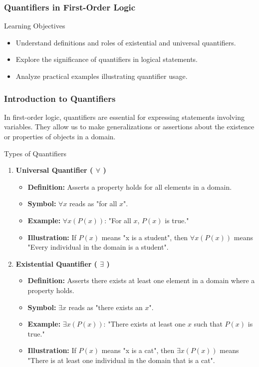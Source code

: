 \documentclass[aspectratio=169]{beamer}
\begin{document}
\begin{frame}[fragile]
    \frametitle{Quantifiers in First-Order Logic}
    \begin{block}{Learning Objectives}
        \begin{itemize}
            \item Understand definitions and roles of existential and universal quantifiers.
            \item Explore the significance of quantifiers in logical statements.
            \item Analyze practical examples illustrating quantifier usage.
        \end{itemize}
    \end{block}
\end{frame}

\begin{frame}[fragile]
    \frametitle{Introduction to Quantifiers}
    In first-order logic, quantifiers are essential for expressing statements involving variables.
    They allow us to make generalizations or assertions about the existence or properties of objects in a domain.
    
    \begin{block}{Types of Quantifiers}
        \begin{enumerate}
            \item \textbf{Universal Quantifier ( $\forall$ )}
                \begin{itemize}
                    \item \textbf{Definition:} Asserts a property holds for all elements in a domain.
                    \item \textbf{Symbol:} \( \forall x \) reads as "for all \( x \)".
                    \item \textbf{Example:} \( \forall x (P(x)) \): "For all \( x \), \( P(x) \) is true."
                    \item \textbf{Illustration:} If \( P(x) \) means "x is a student", then \( \forall x (P(x)) \) means "Every individual in the domain is a student".
                \end{itemize}
            \item \textbf{Existential Quantifier ( $\exists$ )}
                \begin{itemize}
                    \item \textbf{Definition:} Asserts there exists at least one element in a domain where a property holds.
                    \item \textbf{Symbol:} \( \exists x \) reads as "there exists an \( x \)".
                    \item \textbf{Example:} \( \exists x (P(x)) \): "There exists at least one \( x \) such that \( P(x) \) is true."
                    \item \textbf{Illustration:} If \( P(x) \) means "x is a cat", then \( \exists x (P(x)) \) means "There is at least one individual in the domain that is a cat".
                \end{itemize}
        \end{enumerate}
    \end{block}
\end{frame}
\end{document}
